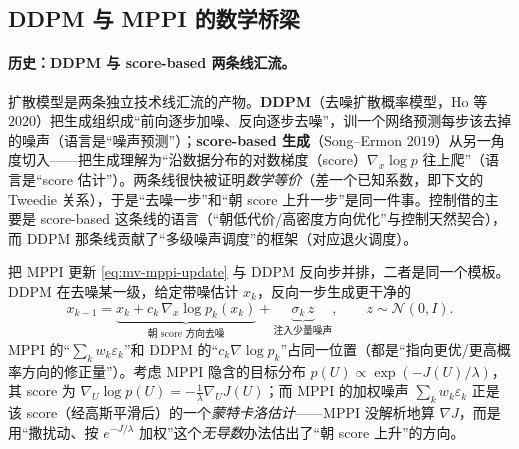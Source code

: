 \subsection{DDPM 与 MPPI 的数学桥梁}
\label{sec:mv-bridge}

\paragraph{历史：DDPM 与 score-based 两条线汇流。}
扩散模型是两条独立技术线汇流的产物。\textbf{DDPM}（去噪扩散概率模型，Ho 等 $2020$）\cite{ho2020ddpm}把生成组织成“前向逐步加噪、反向逐步去噪”，训一个网络预测每步该去掉的噪声（语言是“噪声预测”）；\textbf{score-based 生成}（Song--Ermon $2019$）\cite{song2019score}从另一角度切入——把生成理解为“沿数据分布的对数梯度（score）$\nabla_x\log p$ 往上爬”（语言是“score 估计”）。两条线很快被证明\emph{数学等价}（差一个已知系数，即下文的 Tweedie 关系），于是“去噪一步”和“朝 score 上升一步”是同一件事。控制借的主要是 score-based 这条线的语言（“朝低代价/高密度方向优化”与控制天然契合），而 DDPM 那条线贡献了“多级噪声调度”的框架（对应退火调度）。

\begin{theorem}[MPPI 一步 $=$ 单步去噪 $=$ 一步 score 上升]\label{thm:mv-isomorphism}
把 MPPI 更新 \cref{eq:mv-mppi-update} 与 DDPM 反向步并排，二者是同一个模板。DDPM 在去噪某一级，给定带噪估计 $x_k$，反向一步生成更干净的
\begin{equation}
  x_{k-1}=\underbrace{x_k+c_k\,\nabla_x\log p_k(x_k)}_{\text{朝 score 方向去噪}}+\underbrace{\sigma_k\,z}_{\text{注入少量噪声}},\qquad z\sim\mathcal{N}(0,I).
  \label{eq:mv-ddpm-reverse}
\end{equation}
MPPI 的“$\sum_k w_k\varepsilon_k$”和 DDPM 的“$c_k\nabla\log p_k$”占同一位置（都是“指向更优/更高概率方向的修正量”）。考虑 MPPI 隐含的目标分布 $p(U)\propto\exp(-J(U)/\lambda)$，其 score 为 $\nabla_U\log p(U)=-\tfrac{1}{\lambda}\nabla_U J(U)$；而 MPPI 的加权噪声 $\sum_k w_k\varepsilon_k$ 正是该 score（经高斯平滑后）的一个\emph{蒙特卡洛估计}——MPPI 没解析地算 $\nabla J$，而是用“撒扰动、按 $e^{-J/\lambda}$ 加权”这个\emph{无导数}办法估出了“朝 score 上升”的方向\cite{pan2024mbd}。
\end{theorem}

